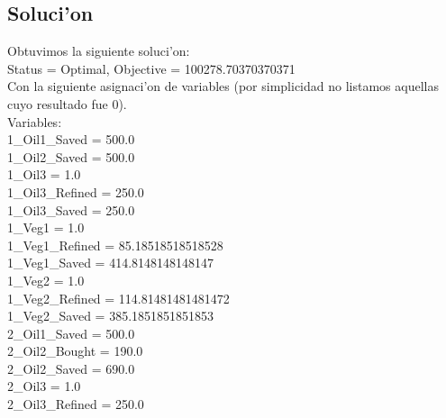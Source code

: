 \subsection{Soluci'on}
Obtuvimos la siguiente soluci'on:\\
Status = Optimal, Objective = 100278.70370370371\\
Con la siguiente asignaci'on de variables (por simplicidad no listamos aquellas cuyo resultado fue 0).\\
Variables: \\
1\_Oil1\_Saved = 500.0\\
1\_Oil2\_Saved = 500.0\\
1\_Oil3 = 1.0\\
1\_Oil3\_Refined = 250.0\\
1\_Oil3\_Saved = 250.0\\
1\_Veg1 = 1.0\\
1\_Veg1\_Refined = 85.18518518518528\\
1\_Veg1\_Saved = 414.8148148148147\\
1\_Veg2 = 1.0\\
1\_Veg2\_Refined = 114.81481481481472\\
1\_Veg2\_Saved = 385.1851851851853\\
2\_Oil1\_Saved = 500.0\\
2\_Oil2\_Bought = 190.0\\
2\_Oil2\_Saved = 690.0\\
2\_Oil3 = 1.0\\
2\_Oil3\_Refined = 250.0\\
